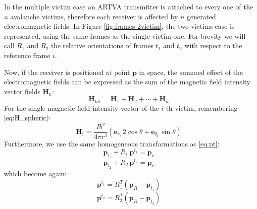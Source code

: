 In the multiple victim case an ARTVA transmitter is attached to every one of the \( n \) avalanche victims, 
therefore each receiver is affected by \( n \) generated electromagnetic fields.
In Figure \ref{fig:frames-2victim}, the two victims case is represented, using the same frames as the single victim one. 
For brevity we will call \( R_1 \) and \( R_2 \) the relative orientations of frames \( t_1 \) and \( t_2 \) with respect to the reference frame \(i\).

Now, if the receiver is positioned at point \( \mathbf{p} \) in space, 
the summed effect of the electromagnetic fields can be expressed as the sum of the magnetic field intensity vector fields \(\mathbf{H}_n\):
\[
\mathbf{H}_{\text{tot}} = 
\mathbf{H}_1 + \mathbf{H}_2 + \cdots + \mathbf{H}_n
\]
For the single magnetic field intensity vector of the \(i\)-th victim, remembering \ref{eq:H_spheric}:
\[
\mathbf{H}_i = \frac{I b^2}{4\pi r^3} \left( \mathbf{e}_{r_i} \, 2 \cos \theta + \mathbf{e}_{\theta_i} \, \sin \theta \right)
\]
Furthermore, we use the same homogeneous transformations as \ref{eq:pt}:
\[
\mathbf{p}_{t_1} + R_1 \, \mathbf{p}^{t_1} = \mathbf{p}_r
\]
\[
\mathbf{p}_{t_2} + R_2 \, \mathbf{p}^{t_2} = \mathbf{p}_r
\]
which become again:
\[
\mathbf{p}^{t_1} = R_1^T \left( \mathbf{p}_R - \mathbf{p}_{t_1} \right)
\]
\[
\mathbf{p}^{t_2} = R_2^T \left( \mathbf{p}_R - \mathbf{p}_{t_2} \right)
\] 

